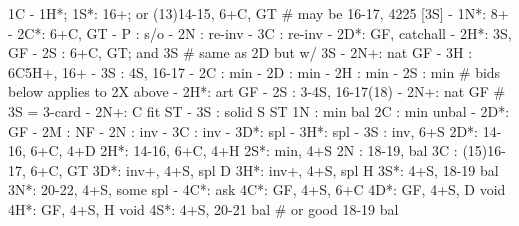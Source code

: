 1C - 1H*;
1S*: 16+; or (13)14-15, 6+C, GT  # may be 16-17, 4225 [3S]
   - 1N*: 8+
        - 2C*: 6+C, GT
             - P  : s/o
             - 2N : re-inv
             - 3C : re-inv
        - 2D*: GF, catchall
        - 2H*: 3S, GF
        - 2S : 6+C, GT; and 3S  # same as 2D but w/ 3S
        - 2N+: nat GF
        - 3H : 6C5H+, 16+
        - 3S : 4S, 16-17
   - 2C : min
   - 2D : min
   - 2H : min
   - 2S : min 
   # bids below applies to 2X above
        - 2H*: art GF
        - 2S : 3-4S, 16-17(18)
        - 2N+: nat GF  # 3S = 3-card
   - 2N+: C fit ST
   - 3S : solid S ST
1N : min bal
2C : min unbal
   - 2D*: GF
   - 2M : NF
   - 2N : inv
   - 3C : inv
   - 3D*: spl
   - 3H*: spl
   - 3S : inv, 6+S
2D*: 14-16, 6+C, 4+D
2H*: 14-16, 6+C, 4+H 
2S*: min, 4+S
2N : 18-19, bal
3C : (15)16-17, 6+C, GT
3D*: inv+, 4+S, spl D
3H*: inv+, 4+S, spl H
3S*: 4+S, 18-19 bal
3N*: 20-22, 4+S, some spl
   - 4C*: ask
4C*: GF, 4+S, 6+C
4D*: GF, 4+S, D void 
4H*: GF, 4+S, H void 
4S*: 4+S, 20-21 bal  # or good 18-19 bal